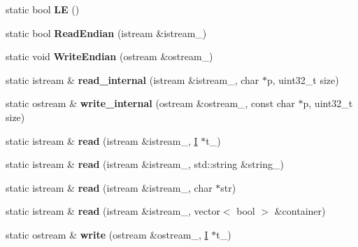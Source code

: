 \begin{DoxyCompactItemize}
\item 
\mbox{\label{classserialize_a160d44cc2c19098e5d41224867559ac4}} 
static bool {\bfseries LE} ()
\item 
\mbox{\label{classserialize_a8b8d6453d506383842486049839f193e}} 
static bool {\bfseries Read\+Endian} (istream \&istream\+\_\+)
\item 
\mbox{\label{classserialize_ab321f5937ee9bcdf95b2703a461729a5}} 
static void {\bfseries Write\+Endian} (ostream \&ostream\+\_\+)
\item 
\mbox{\label{classserialize_a5e32a337b86a0d42bc249f5341edafca}} 
static istream \& {\bfseries read\+\_\+internal} (istream \&istream\+\_\+, char $\ast$p, uint32\+\_\+t size)
\item 
\mbox{\label{classserialize_a0429510b5f6566b1a8d66762436821a2}} 
static ostream \& {\bfseries write\+\_\+internal} (ostream \&ostream\+\_\+, const char $\ast$p, uint32\+\_\+t size)
\item 
\mbox{\label{classserialize_a5eadc0bfb3b9b949b5229f5907e50ea5}} 
static istream \& {\bfseries read} (istream \&istream\+\_\+, \hyperlink{classserialize_1_1_i}{I} $\ast$t\+\_\+)
\item 
\mbox{\label{classserialize_a5b6a3f5be8847e9e4a3890f2585cf986}} 
static istream \& {\bfseries read} (istream \&istream\+\_\+, std\+::string \&string\+\_\+)
\item 
\mbox{\label{classserialize_ae002b9ab2249de365a6c845942029514}} 
static istream \& {\bfseries read} (istream \&istream\+\_\+, char $\ast$str)
\item 
\mbox{\label{classserialize_a91d70f9440a38acd0707d3389a86ddac}} 
static istream \& {\bfseries read} (istream \&istream\+\_\+, vector$<$ bool $>$ \&container)
\item 
\mbox{\label{classserialize_adc8829fc5ca697394bd4a7564c9f423d}} 
static ostream \& {\bfseries write} (ostream \&ostream\+\_\+, \hyperlink{classserialize_1_1_i}{I} $\ast$t\+\_\+)

\end{DoxyCompactItemize}
